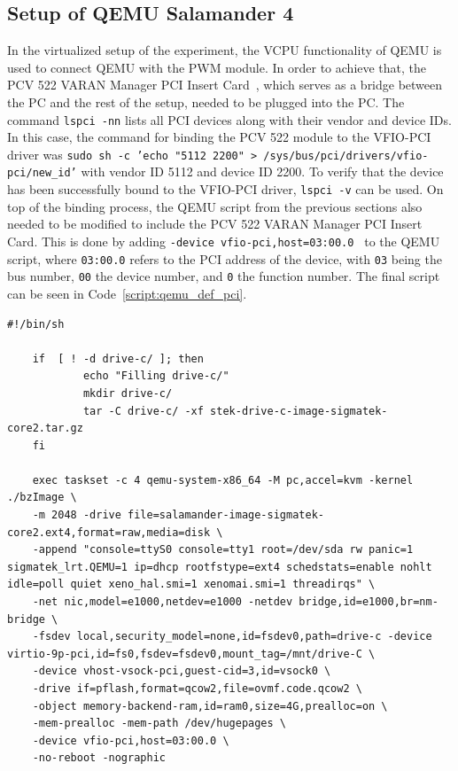 \documentclass[MMR,Master,english]{twbook}
\begin{document}
\subsection{Setup of QEMU Salamander 4}
In the virtualized setup of the experiment, the VCPU functionality of QEMU is used to connect QEMU with the PWM module. In order to achieve that, the PCV 522 VARAN Manager PCI Insert Card~\cite{ControlsHMIsSIGMATEK}, which serves as a bridge between the PC and the rest of the setup, needed to be plugged into the PC. The command \texttt{lspci -nn} lists all PCI devices along with their vendor and device IDs. In this case, the command for binding the PCV 522 module to the VFIO-PCI driver was \texttt{sudo sh -c 'echo "5112 2200" > /sys/bus/pci/drivers/vfio-pci/new\_id'} with vendor ID 5112 and device ID 2200.  To verify that the device has been successfully bound to the VFIO-PCI driver, \texttt{lspci -v} can be used. On top of the binding process, the QEMU script from the previous sections also needed to be modified to include the PCV 522 VARAN Manager PCI Insert Card. This is done by adding \texttt{-device\ vfio-pci,host=03:00.0 } to the QEMU script, where \texttt{03:00.0} refers to the PCI address of the device, with \texttt{03} being the bus number, \texttt{00} the device number, and \texttt{0} the function number. The final script can be seen in Code~\ref{script:qemu_def_pci}. 

\vspace{1em}
\begin{minipage}{\linewidth}
	\begin{lstlisting}[name={Include PCI in QEMU script for Salamander 4 virtualization},label={script:qemu_def_pci}]
	#!/bin/sh

	if  [ ! -d drive-c/ ]; then
			echo "Filling drive-c/"
			mkdir drive-c/
			tar -C drive-c/ -xf stek-drive-c-image-sigmatek-core2.tar.gz
	fi
		
	exec taskset -c 4 qemu-system-x86_64 -M pc,accel=kvm -kernel ./bzImage \
	-m 2048 -drive file=salamander-image-sigmatek-core2.ext4,format=raw,media=disk \
	-append "console=ttyS0 console=tty1 root=/dev/sda rw panic=1 sigmatek_lrt.QEMU=1 ip=dhcp rootfstype=ext4 schedstats=enable nohlt idle=poll quiet xeno_hal.smi=1 xenomai.smi=1 threadirqs" \
	-net nic,model=e1000,netdev=e1000 -netdev bridge,id=e1000,br=nm-bridge \
	-fsdev local,security_model=none,id=fsdev0,path=drive-c -device virtio-9p-pci,id=fs0,fsdev=fsdev0,mount_tag=/mnt/drive-C \
	-device vhost-vsock-pci,guest-cid=3,id=vsock0 \
	-drive if=pflash,format=qcow2,file=ovmf.code.qcow2 \
	-object memory-backend-ram,id=ram0,size=4G,prealloc=on \
	-mem-prealloc -mem-path /dev/hugepages \
	-device vfio-pci,host=03:00.0 \
	-no-reboot -nographic
\end{lstlisting}
\end{minipage}
\end{document}
